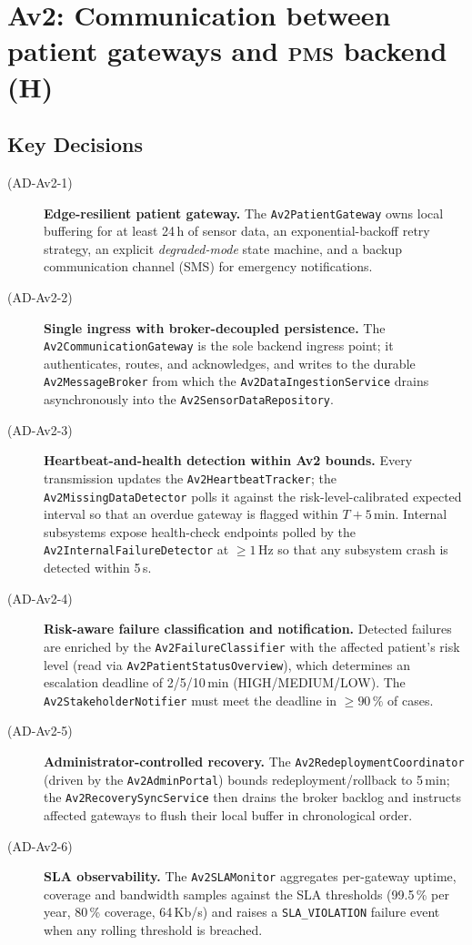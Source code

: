 \section{Av2: Communication between patient gateways and \textsc{pms}
backend (H)}
\label{sec:av2}

\subsection*{Key Decisions}
\begin{description}
  \item[(AD-Av2-1)] \textbf{Edge-resilient patient gateway.}
        The \texttt{Av2PatientGateway} owns local buffering for at least
        24\,h of sensor data, an exponential-backoff retry strategy, an
        explicit \emph{degraded-mode} state machine, and a backup
        communication channel (SMS) for emergency notifications.
  \item[(AD-Av2-2)] \textbf{Single ingress with broker-decoupled
        persistence.}
        The \texttt{Av2CommunicationGateway} is the sole backend ingress
        point; it authenticates, routes, and acknowledges, and writes to
        the durable \texttt{Av2MessageBroker} from which the
        \texttt{Av2DataIngestionService} drains asynchronously into the
        \texttt{Av2SensorDataRepository}.
  \item[(AD-Av2-3)] \textbf{Heartbeat-and-health detection within Av2
        bounds.}
        Every transmission updates the \texttt{Av2HeartbeatTracker}; the
        \texttt{Av2MissingDataDetector} polls it against the
        risk-level-calibrated expected interval so that an overdue gateway
        is flagged within $T{+}5$\,min. Internal subsystems expose
        health-check endpoints polled by the
        \texttt{Av2InternalFailureDetector} at $\geq 1$\,Hz so that any
        subsystem crash is detected within 5\,s.
  \item[(AD-Av2-4)] \textbf{Risk-aware failure classification and
        notification.}
        Detected failures are enriched by the \texttt{Av2FailureClassifier}
        with the affected patient's risk level (read via
        \texttt{Av2PatientStatusOverview}), which determines an escalation
        deadline of 2/5/10\,min (HIGH/MEDIUM/LOW). The
        \texttt{Av2StakeholderNotifier} must meet the deadline in
        $\geq 90\,\%$ of cases.
  \item[(AD-Av2-5)] \textbf{Administrator-controlled recovery.}
        The \texttt{Av2RedeploymentCoordinator} (driven by the
        \texttt{Av2AdminPortal}) bounds redeployment/rollback to 5\,min;
        the \texttt{Av2RecoverySyncService} then drains the broker backlog
        and instructs affected gateways to flush their local buffer in
        chronological order.
  \item[(AD-Av2-6)] \textbf{SLA observability.}
        The \texttt{Av2SLAMonitor} aggregates per-gateway uptime, coverage
        and bandwidth samples against the SLA thresholds (99.5\,\% per
        year, 80\,\% coverage, 64\,Kb/s) and raises a
        \texttt{SLA\_VIOLATION} failure event when any rolling threshold
        is breached.
\end{description}

